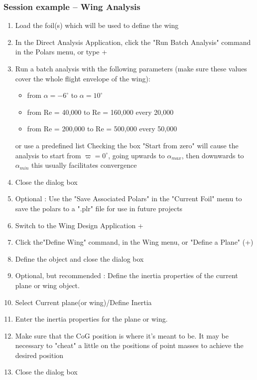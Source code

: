\documentclass[a4paper,twoside,12pt,dvips]{article}
\begin{document}
\subsubsection{Session example -- Wing Analysis}
\label{sec:session_example_wing_analysis}

\begin{enumerate}
\item Load the foil(s) which will be used to define the wing
\item In the Direct Analysis Application, click the "Run Batch
Analysis" command in the Polars menu, or type \Shift + 
\item Run a batch analysis with the following parameters (make sure these
values cover the whole flight envelope of the wing):
\begin{itemize}
\item from $\alpha = -6^\circ$ to $\alpha = 10^\circ$
\item from Re = 40,000 to Re = 160,000 every 20,000
\item from Re = 200,000 to Re = 500,000 every 50,000
\end{itemize}
or use a predefined list Checking the box "Start from zero" will cause
the analysis to start from $\varpi = 0^\circ$, going upwards to
$\alpha_{max}$, then downwards to $\alpha_{min}$ this usually
facilitates convergence
\item Close the dialog box
\item Optional : Use the "Save Associated Polars" in the "Current
Foil" menu to save the polars to a ".plr" file for use in future
projects
\item Switch to the Wing Design Application \Ctrl+
\item Click the"Define Wing" command,  in the Wing
menu, or "Define a Plane" (\Ctrl+)
\item Define the object and close the dialog box
\item Optional, but recommended : Define the inertia properties of the current
plane or wing object.
\item Select Current plane(or wing)/Define Inertia
\item Enter the inertia properties for the plane or wing.
\item Make sure that the CoG position is where it's meant to
be. It may be necessary to "cheat" a little
on the positions of point masses to achieve the desired position
\item Close the dialog box

\end{enumerate}
\end{document}
